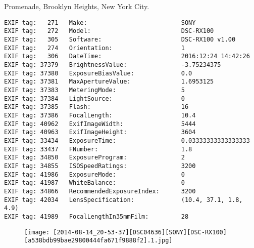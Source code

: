 \section{\protect{}}
\noindent Promenade, Brooklyn Heights, New York City.
\noindent
\begin{lstlisting}
EXIF tag:   271   Make:                          SONY
EXIF tag:   272   Model:                         DSC-RX100
EXIF tag:   305   Software:                      DSC-RX100 v1.00
EXIF tag:   274   Orientation:                   1
EXIF tag:   306   DateTime:                      2016:12:24 14:42:26
EXIF tag: 37379   BrightnessValue:               -3.75234375
EXIF tag: 37380   ExposureBiasValue:             0.0
EXIF tag: 37381   MaxApertureValue:              1.6953125
EXIF tag: 37383   MeteringMode:                  5
EXIF tag: 37384   LightSource:                   0
EXIF tag: 37385   Flash:                         16
EXIF tag: 37386   FocalLength:                   10.4
EXIF tag: 40962   ExifImageWidth:                5444
EXIF tag: 40963   ExifImageHeight:               3604
EXIF tag: 33434   ExposureTime:                  0.03333333333333333
EXIF tag: 33437   FNumber:                       1.8
EXIF tag: 34850   ExposureProgram:               2
EXIF tag: 34855   ISOSpeedRatings:               3200
EXIF tag: 41986   ExposureMode:                  0
EXIF tag: 41987   WhiteBalance:                  0
EXIF tag: 34866   RecommendedExposureIndex:      3200
EXIF tag: 42034   LensSpecification:             (10.4, 37.1, 1.8, 4.9)
EXIF tag: 41989   FocalLengthIn35mmFilm:         28

\end{lstlisting}
\clearpage
\begin{figure}
\raggedleft
\texttt{[image: [2014-08-14\_20-53-37][DSC04636][SONY][DSC-RX100][a538bdb99bae29800444fa671f9888f2].1.jpg]}
\end{figure}

